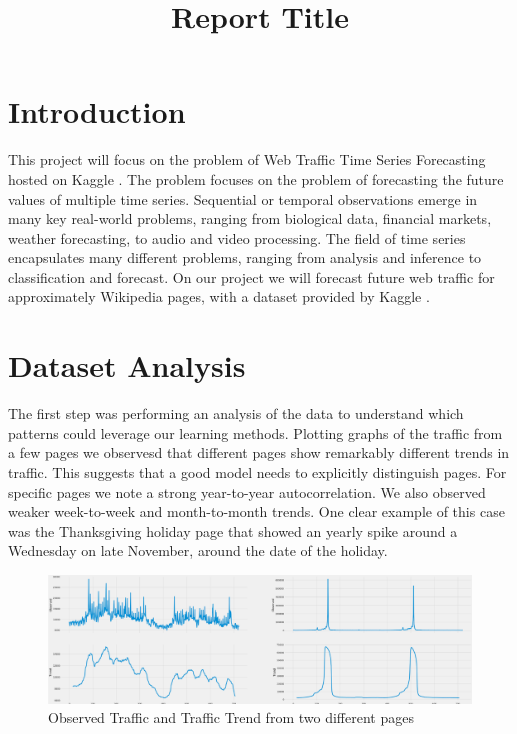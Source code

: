 \documentclass[conference]{IEEEtran}
\begin{document}
\title{Report Title}

\author{
\and
{}
\and
{}
\and
{}
}

\maketitle

\section{Introduction}

This project will focus on the problem of Web Traffic Time Series Forecasting hosted on Kaggle \cite{kaggle}.
The problem focuses on the problem of forecasting the future values of multiple time series. Sequential or temporal observations emerge in many key real-world problems, ranging from biological data, financial markets, weather forecasting, to audio and video processing. The field of time series encapsulates many different problems, ranging from analysis and inference to classification and forecast. On our project we will forecast future web traffic for approximately Wikipedia pages, with a dataset provided by Kaggle \cite{kaggle_data}.

\section{Dataset Analysis}
The first step was performing an analysis of the data to understand which patterns could leverage our learning methods. Plotting graphs of the traffic from a few pages we observesd that different pages show remarkably different trends in traffic. This suggests that a good model needs to explicitly distinguish pages.
For specific pages we note a strong year-to-year autocorrelation. We also observed weaker week-to-week and month-to-month trends. One clear example of this case was the Thanksgiving holiday page that showed an yearly spike around a Wednesday on late November, around the date of the holiday.

\begin{figure}[h!]
  \includegraphics[width=\linewidth]{analysis1.png}
  \caption{Observed Traffic and Traffic Trend from two different pages}
  \label{fig:analysis1}
\end{figure}
\end{document}
